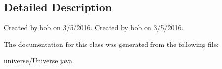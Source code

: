 \subsection{Detailed Description}
Created by bob on 3/5/2016. Created by bob on 3/5/2016. 

The documentation for this class was generated from the following file\+:\begin{DoxyCompactItemize}
\item 
universe/Universe.\+java\end{DoxyCompactItemize}
